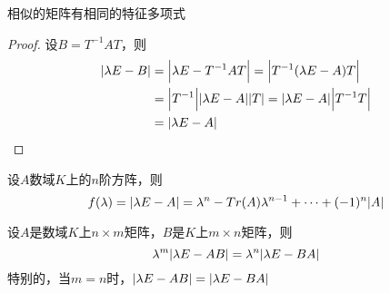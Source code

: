 \documentclass[11pt]{article}
\begin{document}
\begin{proposition}[]
相似的矩阵有相同的特征多项式
\end{proposition}

\begin{proof}
设\(B=T^{-1}AT\)，则
\begin{align*}
\abs{\lambda E-B}&=\abs{\lambda E-T^{-1}AT}=\abs{T^{-1}(\lambda E-A)T}\\
&=\abs{T^{-1}}\abs{\lambda E-A}\abs{T}=\abs{\lambda E-A}\abs{T^{-1}T}\\
&=\abs{\lambda E-A}
\end{align*}
\end{proof}

\begin{proposition}[]
设\(A\)数域\(K\)上的\(n\)阶方阵，则
\begin{equation*}
f(\lambda)=\abs{\lambda E-A}=
\lambda^n-Tr(A)\lambda^{n-1}+\dots+(-1)^n\abs{A}
\end{equation*}
\end{proposition}

\begin{proposition}[]
设\(A\)是数域\(K\)上\(n\times m\)矩阵，\(B\)是\(K\)上\(m\times n\)矩阵，则
\begin{equation*}
\lambda^m\abs{\lambda E-AB}=\lambda^n\abs{\lambda E-BA}
\end{equation*}
特别的，当\(m=n\)时，\(\abs{\lambda E-AB}=\abs{\lambda E-BA}\)
\end{proposition}
\end{document}
